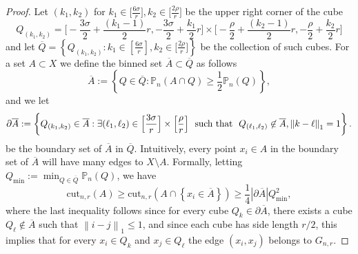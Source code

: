 \documentclass[11pt,twoside]{article}
\theoremstyle{definition}
\newcommand{\set}[1]{\left\{#1\right\}}
\newcommand{\cut}{\mathrm{cut}}
\newcommand{\abs}[1]{\left \lvert #1 \right \rvert}
\newcommand{\norm}[1]{\left\lVert#1\right\rVert}
\newcommand{\1}{\mathbbm{1}}
\newcommand{\Pbb}{\mathbb{P}}
\begin{document}
\begin{proof}
	Let $(k_1,k_2)$ for $k_1 \in \bigl[\frac{6\sigma}{r}\bigr], k_2 \in \bigl[\frac{2\rho}{r}\bigr]$ be the upper right  corner of the cube
	\begin{equation*}
	Q_{(k_1,k_2)} = \biggl[-\frac{3\sigma}{2} + \frac{(k_1 - 1)}{2}r, -\frac{3\sigma}{2} + \frac{k_1}{2}r\biggr] \times \biggl[-\frac{\rho}{2} + \frac{(k_2 - 1)}{2}r, -\frac{\rho}{2} + \frac{k_2}{2}r\biggr]
	\end{equation*}
	and let $\overline{Q} = \set{Q_{(k_1,k_2)}: k_1 \in \left[\frac{6\sigma}{r}\right], k_2 \in \bigl[\frac{2\rho}{r}\bigr]}$ be the collection of such cubes. For a set $A \subset X$ we define the binned set $\overline{A} \subset \overline{Q}$ as follows
	\begin{equation*}
	\overline{A} := \set{Q \in \overline{Q}: \Pbb_n(A \cap Q) \geq \frac{1}{2}\Pbb_n(Q)},
	\end{equation*}
	and we let 
	\begin{equation*}
	\partial \overline{A} := \set{Q_{(k_1,k_2)} \in \overline{A}: \exists (\ell_1,\ell_2) \in \Bigl[\frac{3\sigma}{r}\Bigr] \times \Bigl[\frac{\rho}{r}\Bigr]~~\textrm{such that}~~Q_{(\ell_1,\ell_2)} \not\in \overline{A}, \norm{k - \ell}_1 = 1}.
	\end{equation*}
	be the boundary set of $\overline{A}$ in $\overline{Q}$. Intuitively, every point $x_i \in A$ in the boundary set of $\overline{A}$ will have many edges to $X\setminus A$. Formally, letting $Q_{\min} := \min_{Q \in \overline{Q}} \Pbb_n(Q)$, we have
	\begin{equation}
	\label{eqn:normalized_cut_lb_pf1}
	\cut_{n,r}(A) \geq \cut_{n,r}(A \cap \set{x_i \in \overline{A}}) \geq \frac{1}{4} \abs{\partial \overline{A}} Q_{\min}^2,
	\end{equation}
	where the last inequality follows since for every cube $Q_k \in \partial\overline{A}$, there exists a cube $Q_\ell \not\in \overline{A}$ such that $\norm{i - j}_1 \leq 1$, and since each cube has side length $r/2$, this implies that for every $x_i \in Q_k$ and $x_j \in Q_\ell$ the edge $(x_i,x_j)$ belongs to $G_{n,r}$. 
	

\end{proof}
\end{document}

